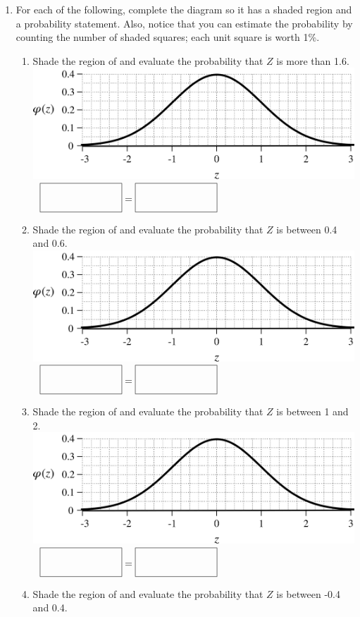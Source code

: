 \documentclass[12pt,letterpaper]{article}
\begin{document}
\newpage
\begin{enumerate}[resume]
\item For each of the following, complete the diagram so it has a shaded region and a probability statement. Also, notice that you can estimate the probability by counting the number of shaded squares; each unit square is worth 1\%.
\begin{enumerate}
\item Shade the region of and evaluate the probability that $Z$ is more than 1.6.
\\ \includegraphics[scale=0.7]{blank.png}   $~~\emptybox=\emptybox$
\vfill
\item Shade the region of and evaluate the probability that $Z$ is between 0.4 and 0.6.
\\ \includegraphics[scale=0.7]{blank.png}   $~~\emptybox=\emptybox$
\vfill
\item Shade the region of and evaluate the probability that $Z$ is between 1 and 2.
\\ \includegraphics[scale=0.7]{blank.png}   $~~\emptybox=\emptybox$
\vfill
\item Shade the region of and evaluate the probability that $Z$ is between -0.4 and 0.4.

\end{enumerate}
\end{enumerate}
\end{document}
